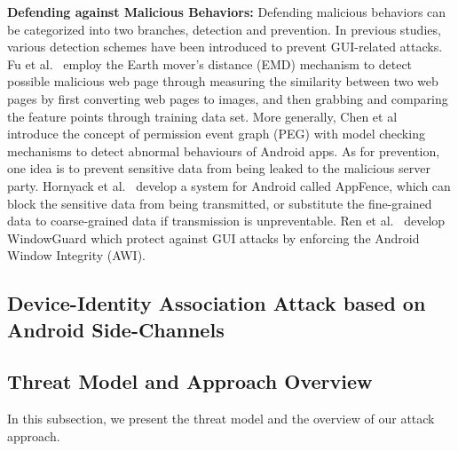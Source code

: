 \documentclass[letterpaper,12pt]{article}
\begin{document}
\textbf{Defending against Malicious Behaviors:} Defending malicious
behaviors can be categorized into two branches, detection and
prevention. In previous studies, various detection schemes have been
introduced to prevent GUI-related attacks. Fu
et al.~\cite{detectpswebsite} employ the Earth mover's distance (EMD)
mechanism to detect possible malicious web page through measuring the
similarity between two web pages by first converting web pages to
images, and then grabbing and comparing the feature points through
training data set. More generally, Chen et al~\cite{peg} introduce the
concept of permission event graph (PEG) with model checking mechanisms
to detect abnormal behaviours of Android apps. As for prevention, one
idea is to prevent sensitive data from being leaked to the malicious
server party. Hornyack et al.~\cite{AppFence} develop a
system for Android called AppFence, which can block the sensitive data
from being transmitted, or substitute the fine-grained data to
coarse-grained data if transmission is unpreventable. Ren
et al.~\cite{Windowguard} develop WindowGuard which protect against GUI
attacks by enforcing the Android Window Integrity (AWI).

   \newpage
   \begin{singlespace}
   \section{Device-Identity Association Attack based on Android Side-Channels}
   \end{singlespace}
   \label{sec:dssnassociate}
   
   \subsection{Threat Model and Approach Overview}\label{sec:dssnthreatapproach}
   In this subsection, we present the threat model and the overview of our attack approach.
\end{document}
